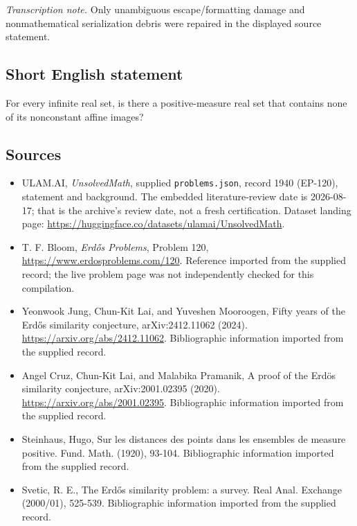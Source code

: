 \documentclass[11pt,a4paper]{article}
\begin{document}
{\small\emph{Transcription note.} Only unambiguous escape/formatting damage and nonmathematical serialization debris were repaired in the displayed source statement.}

\subsection{Short English statement}

For every infinite real set, is there a positive-measure real set that contains none of its nonconstant affine images?

\subsection{Sources}

{\small

\begin{itemize}

\item[\hypertarget{source:1940:1}{S1}] ULAM.AI, \emph{UnsolvedMath}, supplied \texttt{problems.json}, record 1940 (EP-120), statement and background. The embedded literature-review date is 2026-08-17; that is the archive’s review date, not a fresh certification. Dataset landing page: \url{https://huggingface.co/datasets/ulamai/UnsolvedMath}.

\item[\hypertarget{source:1940:2}{S2}] T. F. Bloom, \emph{Erdős Problems}, Problem 120, \url{https://www.erdosproblems.com/120}. Reference imported from the supplied record; the live problem page was not independently checked for this compilation.

\item[\hypertarget{source:1940:3}{S3}] Yeonwook Jung, Chun-Kit Lai, and Yuveshen Mooroogen, Fifty years of the Erdős similarity conjecture, arXiv:2412.11062 (2024). \url{https://arxiv.org/abs/2412.11062}. Bibliographic information imported from the supplied record.

\item[\hypertarget{source:1940:4}{S4}] Angel Cruz, Chun-Kit Lai, and Malabika Pramanik, A proof of the Erdös similarity conjecture, arXiv:2001.02395 (2020). \url{https://arxiv.org/abs/2001.02395}. Bibliographic information imported from the supplied record.

\item[\hypertarget{source:1940:5}{S5}] Steinhaus, Hugo, Sur les distances des points dans les ensembles de measure positive. Fund. Math. (1920), 93-104. Bibliographic information imported from the supplied record.

\item[\hypertarget{source:1940:6}{S6}] Svetic, R. E., The Erd\H{o}s similarity problem: a survey. Real Anal. Exchange (2000/01), 525-539. Bibliographic information imported from the supplied record.

\end{itemize}

}

\label{end:1940}
\end{document}
